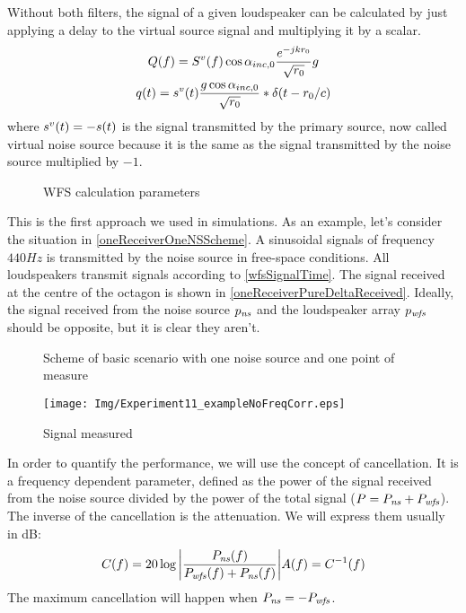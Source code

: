 Without both filters, the signal of a given loudspeaker can be calculated by just applying a delay to the virtual source signal and multiplying it by a scalar.
\begin{gather}
\signal[wfs][frequency](f) = \signal[nsVirt][frequency](f) \cos\normPrimaryPropAngleSection \frac{e^{-jk\distLinePrimSource}}{\sqrt{\distLinePrimSource}} g
\\
\signal[wfs][time](t) = \signal[nsVirt][time](t) \frac{g \cos\normPrimaryPropAngleSection}{\sqrt{\distLinePrimSource}}
\ast\delta(t - \distLinePrimSource/c)
\label{wfsSignalTime}
\end{gather}
where $\signal[nsVirt][time](t) = -\signal[ns][time](t)$ is the signal transmitted by the primary source, now called virtual noise source because it is the same as the signal transmitted by the noise source multiplied by $-1$.
\begin{figure}
	\centering
	\def\svgwidth{0.4\columnwidth}
	\graphicspath{{Img/}}
	
	\caption[WFS calculation parameters]{WFS calculation parameters}
	\label{figAngleCondition}
\end{figure}

This is the first approach we used in simulations. As an example, let's consider the situation in \autoref{oneReceiverOneNSScheme}. A sinusoidal signals of frequency $440 \si{Hz}$ is transmitted by the noise source in free-space conditions. All loudspeakers transmit signals according to \autoref{wfsSignalTime}. The signal received at the centre of the octagon is shown in \autoref{oneReceiverPureDeltaReceived}. Ideally, the signal received from the noise source $\Field[ns][time]$ and the loudspeaker array $\Field[wfs][time]$ should be opposite, but it is clear they aren't.

\begin{figure}
	\centering
	\caption[Scheme of basic scenario]{Scheme of basic scenario with one noise source and one point of measure}
	\label{oneReceiverOneNSScheme}
\end{figure}

\begin{figure}
	\centering
	\texttt{[image: Img/Experiment11\_exampleNoFreqCorr.eps]}
	\caption{Signal measured}
	\label{oneReceiverPureDeltaReceived}
\end{figure}

In order to quantify the performance, we will use the concept of cancellation. It is a frequency dependent parameter, defined as the power of the signal received from the noise source divided by the power of the total signal ($\Field[total][frequency] = \Field[ns][frequency] + \Field[wfs][frequency]$). The inverse of the cancellation is the attenuation. We will express them usually in dB:
\begin{equation}
\cancellation(f) = 20\log{\left\lvert\frac{\Field[ns][frequency](f)}{\Field[wfs][frequency](f) + \Field[ns][frequency](f)}\right\rvert}
\attenuation(f) = \cancellation^{-1}(f)
\end{equation}
The maximum cancellation will happen when $\Field[ns][frequency] = -\Field[wfs][frequency]$.

